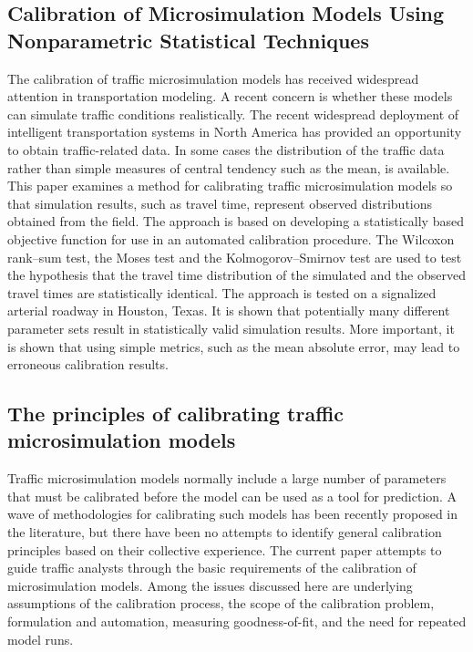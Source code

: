 \documentclass{article}
\begin{document}
\subsection*{Calibration of Microsimulation Models Using Nonparametric Statistical Techniques \cite{calibMicroNPST}
}
The calibration of traffic microsimulation models has received widespread attention in transportation modeling. A recent concern is whether these models can simulate traffic conditions realistically. The recent widespread deployment of intelligent transportation systems in North America has provided an opportunity to obtain traffic-related data. In some cases the distribution of the traffic data rather than simple measures of central tendency such as the mean, is available. This paper examines a method for calibrating traffic microsimulation models so that simulation results, such as travel time, represent observed distributions obtained from the field. The approach is based on developing a statistically based objective function for use in an automated calibration procedure. The Wilcoxon rank–sum test, the Moses test and the Kolmogorov–Smirnov test are used to test the hypothesis that the travel time distribution of the simulated and the observed travel times are statistically identical. The approach is tested on a signalized arterial roadway in Houston, Texas. It is shown that potentially many different parameter sets result in statistically valid simulation results. More important, it is shown that using simple metrics, such as the mean absolute error, may lead to erroneous calibration results.

\subsection*{The principles of calibrating traffic microsimulation models \cite{prinCalib}} 
Traffic microsimulation models normally include a large number of parameters that must be calibrated before the model can be used as a tool for prediction. A wave of methodologies for calibrating such models has been recently proposed in the literature, but there have been no attempts to identify general calibration principles based on their collective experience. The current paper attempts to guide traffic analysts through the basic requirements of the calibration of microsimulation models. Among the issues discussed here are underlying assumptions of the calibration process, the scope of the calibration problem, formulation and automation, measuring goodness-of-fit, and the need for repeated model runs. %
\end{document}
